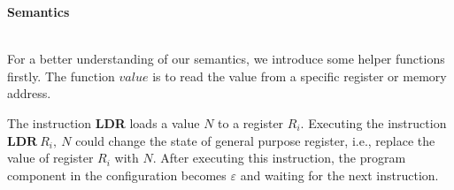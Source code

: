 \documentclass[letterpaper, 10 pt, conference]{IEEEtran}
\begin{document}
\textbf{Semantics}\\ \\
\par For a better understanding of our semantics, we introduce some helper functions firstly. The function $value$ is to read the value from a specific register or memory address.
\par The instruction \textbf{LDR} loads a value $N$ to a register $R_i$. Executing the instruction $\textbf{LDR}~R_i,~N$ could change the state of general purpose register, i.e., replace the value of register $R_i$ with $N$. After executing this instruction, the program component in the configuration becomes $\varepsilon$ and waiting for the next instruction.\\ \\
\end{document}
